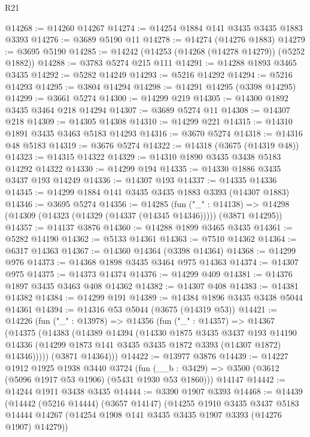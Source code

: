 \begin{lexlean}{R21}
\begin{coremodule}
@14268 := @14260 @14267
@14274 := @14254 @1884 @141 @3435 @3435 @1883 @3393
@14276 := @3689 @5190 @11
@14278 := @14274 (@14276 @1883)
@14279 := @3695 @5190
@14285 := @14242 (@14253 (@14268 (@14278 @14279)) (@5252 @1882))
@14288 := @3783 @5274 @215 @111
@14291 := @14288 @1893 @3465 @3435
@14292 := @5282 @14249
@14293 := @5216 @14292
@14294 := @5216 @14293
@14295 := @3804 @14294
@14298 := @14291 @14295 (@3398 @14295)
@14299 := @3661 @5274
@14300 := @14299 @219
@14305 := @14300 @1892 @3435 @3464 @218 @14294
@14307 := @3689 @5274 @11
@14308 := @14307 @218
@14309 := @14305 @14308
@14310 := @14299 @221
@14315 := @14310 @1891 @3435 @3463 @5183 @14293
@14316 := @3670 @5274
@14318 := @14316 @48 @5183
@14319 := @3676 @5274
@14322 := @14318 (@3675 (@14319 @48))
@14323 := @14315 @14322
@14329 := @14310 @1890 @3435 @3438 @5183 @14292 @14322
@14330 := @14299 @194
@14335 := @14330 @1886 @3435 @3437 @193 @14249
@14336 := @14307 @193
@14337 := @14335 @14336
@14345 := @14299 @1884 @141 @3435 @3435 @1883 @3393 (@14307 @1883)
@14346 := @3695 @5274
@14356 := @14285
    (fun ("_" : @14138) =>
    @14298 (@14309 (@14323 (@14329 (@14337 (@14345 @14346))))) (@3871 @14295))
@14357 := @14137 @3876
@14360 := @14288 @1899 @3465 @3435
@14361 := @5282 @14190
@14362 := @5133 @14361
@14363 := @7510 @14362
@14364 := @6317 @14363
@14367 := @14360 @14364 (@3398 @14364)
@14368 := @14299 @976
@14373 := @14368 @1898 @3435 @3464 @975 @14363
@14374 := @14307 @975
@14375 := @14373 @14374
@14376 := @14299 @409
@14381 := @14376 @1897 @3435 @3463 @408 @14362
@14382 := @14307 @408
@14383 := @14381 @14382
@14384 := @14299 @191
@14389 := @14384 @1896 @3435 @3438 @5044 @14361
@14394 := @14316 @53 @5044 (@3675 (@14319 @53))
@14421 := @14226
    (fun ("_" : @13978) =>
    @14356
      (fun ("_" : @14357) =>
      @14367
        (@14375
          (@14383
            (@14389
              @14394
              (@14330
                @1875
                @3435
                @3437
                @193
                @14190
                @14336
                (@14299 @1873 @141 @3435 @3435 @1872 @3393 (@14307 @1872) @14346)))))
        (@3871 @14364)))
@14422 := @13977 @3876
@14439 := @14227
    @1912
    @1925
    @1938
    @3440
    @3724
    (fun (__b : @3429) => @3500 (@3612 (@5096 @1917 @53 @1906) (@5431 @1930 @53 @1860)))
    @14147
@14442 := @14244 @1911 @3438 @3435
@14444 := @3390 @1907 @3393
@14468 := @14439
    (@14442
      (@5216 @14444)
      (@3657 @14147)
      (@14255
        @1910
        @3435
        @3437
        @5183
        @14444
        @14267
        (@14254 @1908 @141 @3435 @3435 @1907 @3393 (@14276 @1907) @14279))

\end{coremodule}
\end{lexlean}
